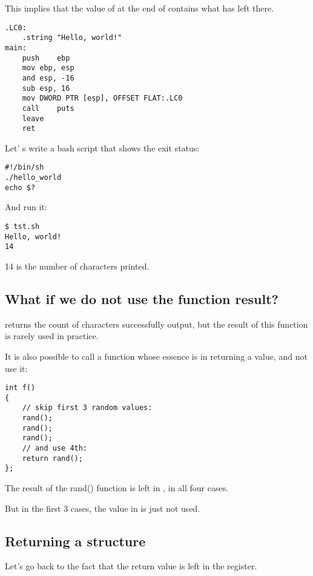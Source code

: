 This implies that the value of \EAX at the end of \main contains what \puts has left there.

\begin{lstlisting}[caption=GCC 4.8.1]
.LC0:
	.string	"Hello, world!"
main:
	push	ebp
	mov	ebp, esp
	and	esp, -16
	sub	esp, 16
	mov	DWORD PTR [esp], OFFSET FLAT:.LC0
	call	puts
	leave
	ret
\end{lstlisting}


Let' s write a bash script that shows the exit status:

\begin{lstlisting}[caption=tst.sh]
#!/bin/sh
./hello_world
echo $?
\end{lstlisting}

And run it:

\begin{lstlisting}
$ tst.sh 
Hello, world!
14
\end{lstlisting}

14 is the number of characters printed.

\subsection{What if we do not use the function result?}

\printf returns the count of characters successfully output, but the result of this function 
is rarely used in practice.

It is also possible to call a function whose essence is in returning a value, and not use it:

\begin{lstlisting}
int f()
{
    // skip first 3 random values:
    rand();
    rand();
    rand();
    // and use 4th:
    return rand();
};
\end{lstlisting}

The result of the rand() function is left in \EAX, in all four cases.

But in the first 3 cases, the value in \EAX is just not used.

\subsection{Returning a structure}


Let's go back to the fact that the return value is left in the \EAX register.

